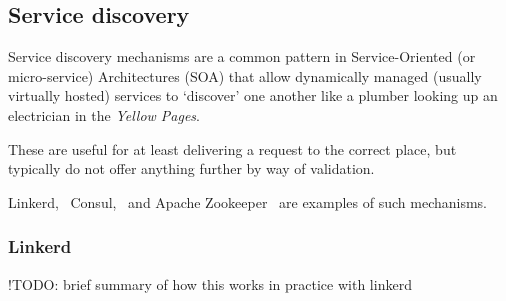 \subsection{Service discovery} \label{soln:service-discovery}

Service discovery mechanisms are a common pattern in Service-Oriented (or micro-service) Architectures (SOA) that allow dynamically managed (usually virtually hosted) services to `discover' one another like a plumber looking up an electrician in the \emph{Yellow Pages}. 

These are useful for at least delivering a request to the correct place, but typically do not offer anything further by way of validation.

Linkerd,~\cite{service_discovery_linkerd} Consul,~\cite{service_discovery_consul} and Apache Zookeeper~\cite{service_discovery_apache} are examples of such mechanisms.

\subsubsection{Linkerd} \label{soln:service-discovery:linkerd}

!TODO: brief summary of how this works in practice with linkerd